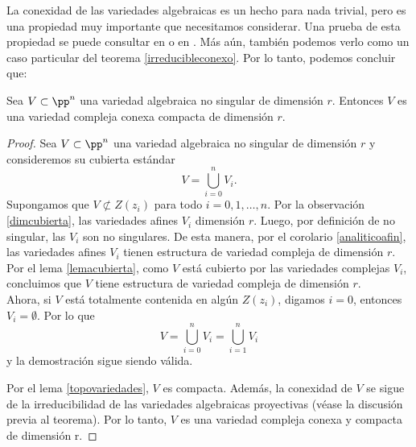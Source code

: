     La conexidad de las variedades algebraicas es un hecho para nada trivial, pero es una propiedad muy importante que necesitamos considerar. Una prueba de esta propiedad se puede consultar en \parencite[Cap. 4 Sec. 4.2]{carlosga} o en \parencite[Cap. VII Sec. 2]{shafarevich2016basic}. Más aún, también podemos verlo como un caso particular del teorema \ref{irreducibleconexo}. Por lo tanto, podemos concluir que:
    
    \begin{theorem}\label{varalg}
		Sea $V\subset\pp^n$ una variedad algebraica no singular de dimensión $r$. Entonces $V$ es una variedad compleja conexa compacta de dimensión $r$.    	
    \end{theorem}
   	\begin{proof}
   		Sea $V\subset\pp^n$ una variedad algebraica no singular de dimensión $r$ y consideremos su cubierta estándar 
   		\begin{equation*}
   			V=\bigcup_{i=0}^n V_i.
   		\end{equation*}
   		Supongamos que $V\not\subset Z(z_i)$ para todo $i=0,1,\dots,n$. Por la observación \ref{dimcubierta}, las variedades afines $V_i$ dimensión $r$. Luego, por definición de no singular, las $V_i$ son no singulares. De esta manera, por el corolario \ref{analiticoafin}, las variedades afines $V_i$ tienen estructura de variedad compleja de dimensión $r$.\\
   		Por el lema \ref{lemacubierta}, como $V$ está cubierto por las variedades complejas $V_i$, concluimos que $V$ tiene estructura de variedad compleja de dimensión $r$.\\
   		Ahora, si $V$ está totalmente contenida en algún $Z(z_i)$, digamos $i=0$, entonces $V_i=\emptyset$. Por lo que
   		\begin{equation*}
   			V=\bigcup_{i=0}^n V_i=\bigcup_{i=1}^n V_i
   		\end{equation*}
   		y la demostración sigue siendo válida.
   		
   		Por el lema \ref{topovariedades}, $V$ es compacta. Además, la conexidad de $V$ se sigue de la irreducibilidad de las variedades algebraicas proyectivas (véase la discusión previa al teorema). Por lo tanto, $V$ es una variedad compleja conexa y compacta de dimensión r.
   	\end{proof}

 
